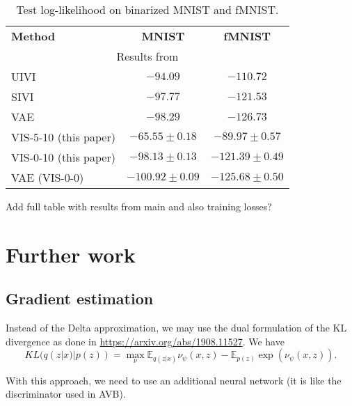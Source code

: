 \begin{table}[!ht]
\centering
\caption{Test log-likelihood on binarized MNIST and fMNIST.}\label{tbl:iwhvae}
\begin{tabular}{lcc}
\cline{1-3}
\textbf{Method}   & \textbf{MNIST}                             & \textbf{fMNIST}   \\ \cline{1-3}
\multicolumn{3}{c}{\small Results from \cite{pmlr-v89-titsias19a}}       \\
    UIVI          & $-94.09$ &  $-110.72$ \\
    SIVI          & $-97.77$ &  $-121.53$ \\
    VAE          & $-98.29$ &  $-126.73$ \\
    \cline{1-3}
    VIS-5-10 (this paper)     & $\bm{-65.55 \pm 0.18}$ & $\bm{-89.97 \pm 0.57}$  \\
    VIS-0-10 (this paper)     & $-98.13 \pm 0.13$ & $-121.39 \pm 0.49$  \\
    VAE (VIS-0-0)              & $-100.92 \pm 0.09$ & $-125.68 \pm 0.50$ \\
\end{tabular}
\end{table}

Add full table with results from main and also training losses?
\fi

\iffalse
\section{Further work}

\subsection{Gradient estimation}

Instead of the Delta approximation, we may use the dual formulation of the KL divergence as done in \url{https://arxiv.org/abs/1908.11527}. We have 
$$
KL(q(z|x) | p(z)) = \max_{\nu} \mathbb{E}_{q(z|x)} \nu_{\psi}(x,z) -  \mathbb{E}_{p(z)} \exp (\nu_{\psi}(x,z)).
$$

With this approach, we need to use an additional neural network (it is like the discriminator used in AVB).


